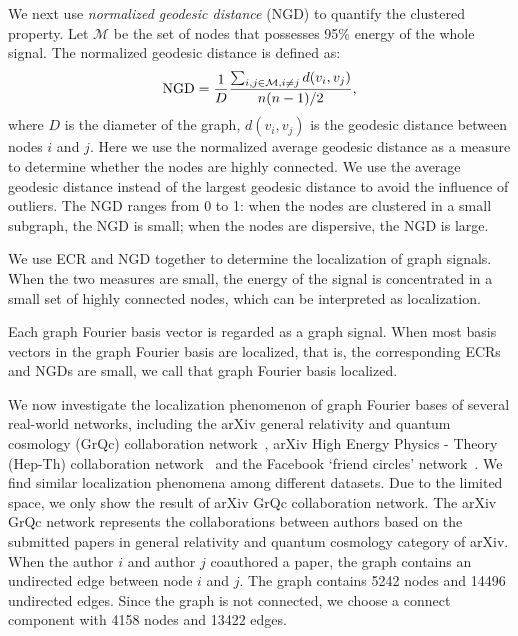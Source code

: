 \documentclass[journal,twocolumn,10pt]{IEEEtran}
\theoremstyle{definition}
\def\M{\mathcal{M}}
\begin{document}
We next use \textit{normalized geodesic distance} (NGD) to quantify the clustered property.
Let $\M$ be the set of nodes that possesses 95\% energy of the whole signal. The normalized geodesic distance is defined as:
\begin{equation*}
	{\rm{NGD}} = \frac{1}{D}\frac{\sum_{ i, j \in \M, i \neq j}d(v_i,v_j)}{n(n-1)/2},
\end{equation*}
where $D$ is the diameter of the graph, $d(v_i,v_j)$ is the geodesic distance between nodes $i$ and $j$. Here we use the normalized average geodesic distance as a measure to determine whether the nodes are highly connected. We use the average geodesic distance instead of the largest geodesic distance to avoid the influence of outliers. The NGD ranges from 0 to 1: when the nodes are clustered in a small subgraph, the NGD is small; when the nodes are dispersive, the NGD is large.

We use ECR and NGD together to determine the localization of graph signals. When the two measures are small, the energy of the signal is concentrated in a small set of highly connected nodes, which can be interpreted as localization.

Each graph Fourier basis vector is regarded as a graph signal. When most basis vectors in the graph Fourier basis are localized, that is, the corresponding ECRs and NGDs are small, we call that graph Fourier basis localized.

We now investigate the localization phenomenon of graph Fourier bases of several real-world networks, including the arXiv general relativity and quantum cosmology (GrQc) collaboration network~\cite{LeskovecKF:07}, arXiv High Energy Physics - Theory (Hep-Th) collaboration network~\cite{LeskovecKF:07} and the Facebook `friend circles' network~\cite{LeskovecKF:07}. We find similar localization phenomena among different datasets. Due to the limited space, we only show the result of arXiv GrQc collaboration network. The arXiv GrQc network represents the collaborations between authors based on the submitted papers in general relativity and quantum cosmology category of arXiv. When the author $i$ and author $j$ coauthored a paper, the graph contains an undirected edge between node $i$ and $j$. The graph contains 5242 nodes and 14496 undirected edges. Since the graph is not connected, we choose a connect component with 4158 nodes and 13422 edges.
\end{document}
